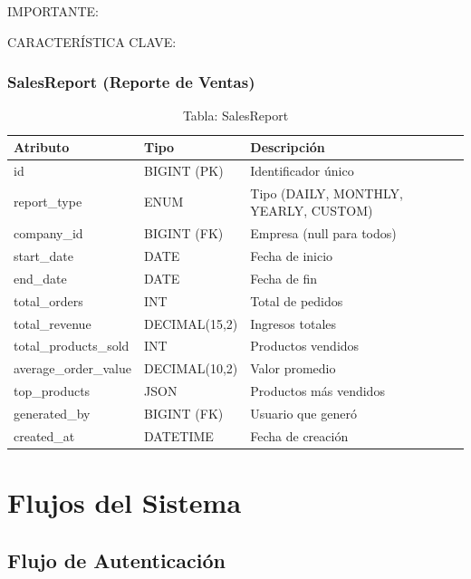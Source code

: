 \documentclass[12pt,a4paper,oneside]{book}
\begin{document}
\begin{alert}{IMPORTANTE:}
\begin{info}{CARACTERÍSTICA CLAVE:}
\subsection{SalesReport (Reporte de Ventas)}
\label{sec:salesreport}

\begin{table}[ht]
    \centering
    \caption{Tabla: SalesReport}
    \begin{tabular}{@{}lll@{}}
        \toprule
        \textbf{Atributo} & \textbf{Tipo} & \textbf{Descripción} \\
        \midrule
        id & BIGINT (PK) & Identificador único \\
        report\_type & ENUM & Tipo (DAILY, MONTHLY, YEARLY, CUSTOM) \\
        company\_id & BIGINT (FK) & Empresa (null para todos) \\
        start\_date & DATE & Fecha de inicio \\
        end\_date & DATE & Fecha de fin \\
        total\_orders & INT & Total de pedidos \\
        total\_revenue & DECIMAL(15,2) & Ingresos totales \\
        total\_products\_sold & INT & Productos vendidos \\
        average\_order\_value & DECIMAL(10,2) & Valor promedio \\
        top\_products & JSON & Productos más vendidos \\
        generated\_by & BIGINT (FK) & Usuario que generó \\
        created\_at & DATETIME & Fecha de creación \\
        \bottomrule
    \end{tabular}
\end{table}

\chapter{Flujos del Sistema}
\label{cap:flujos}

\section{Flujo de Autenticación}
\label{flujo:auth}


\end{info}
\end{alert}
\end{document}
